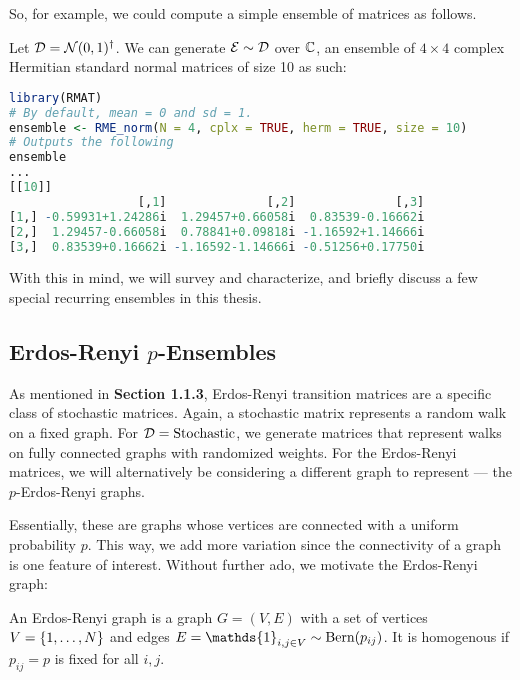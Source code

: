 \medskip
\noindent So, for example, we could compute a simple ensemble of matrices as follows.
\begin{code}
Let $\mathcal{D} = \Normal(0,1)^{\dagger}$. We can generate $\Ens \sim \D$ over $\Cc$, an ensemble of $4 \times 4$ complex Hermitian standard normal matrices of size 10 as such:
\end{code}

\begin{lstlisting}[language=R]
library(RMAT)
# By default, mean = 0 and sd = 1.
ensemble <- RME_norm(N = 4, cplx = TRUE, herm = TRUE, size = 10)
# Outputs the following
ensemble
...
[[10]]
                  [,1]              [,2]              [,3]
[1,] -0.59931+1.24286i  1.29457+0.66058i  0.83539-0.16662i
[2,]  1.29457-0.66058i  0.78841+0.09818i -1.16592+1.14666i
[3,]  0.83539+0.16662i -1.16592-1.14666i -0.51256+0.17750i
\end{lstlisting}

With this in mind, we will survey and characterize, and briefly discuss a few special recurring ensembles in this thesis.


\subsection{Erdos-Renyi $p$-Ensembles}

As mentioned in \textbf{Section 1.1.3}, Erdos-Renyi transition matrices are a specific class of stochastic matrices.
Again, a stochastic matrix represents a random walk on a fixed graph. For $\D = \text{Stochastic}$, we generate matrices that represent walks on fully connected graphs with randomized weights.
For the Erdos-Renyi matrices, we will alternatively be considering a different graph to represent --- the $p$-Erdos-Renyi graphs.

Essentially, these are graphs whose vertices are connected with a uniform probability $p$.
This way, we add more variation since the connectivity of a graph is one feature of interest.
Without further ado, we motivate the Erdos-Renyi graph:

\begin{definition}
An Erdos-Renyi graph is a graph $G = (V,E)$ with a set of vertices $V = \{\oneto[N]\}$ and edges $E = \mathds{1}_{i,j \in V} \sim \Bern(p_{ij})$. It is homogenous if $p_{ij} = p$ is fixed for all $i, j$.
\end{definition}

